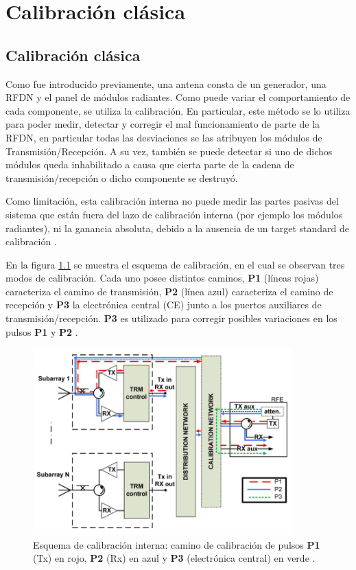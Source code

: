 
\chapter{Calibración clásica}
\label{ch:classicalCalibration}

\section{Calibración clásica}

Como fue introducido previamente, una antena consta de un generador, una RFDN y el panel de módulos radiantes. Como puede
variar el comportamiento de cada componente, se utiliza la calibración. En particular, este método se lo utiliza para poder 
medir, detectar y corregir el mal funcionamiento de parte de la RFDN, en particular todas las desviaciones se las atribuyen 
los módulos de Transmisión/Recepción. A su vez, también se puede detectar si uno de dichos módulos queda inhabilitado a 
causa que cierta parte de la cadena de transmisión/recepción o dicho componente se destruyó.

Como limitación, esta calibración interna no puede medir las partes pasivas del sistema que están fuera del lazo de 
calibración interna (por ejemplo los módulos radiantes), ni la ganancia absoluta, debido a la ausencia de un target standard
de calibración \cite{Wang2010}. 

En la figura \ref{fig:classic_cal_scheme} se muestra el esquema de calibración, en el cual se observan tres modos de 
calibración. Cada uno posee distintos caminos, \textbf{P1} (líneas rojas) caracteriza el camino de transmisión, \textbf{P2}
(línea azul) caracteriza el camino de recepción y \textbf{P3} la electrónica central (CE) junto a los puertos auxiliares de 
transmisión/recepción. \textbf{P3} es utilizado para corregir posibles variaciones en los pulsos \textbf{P1} y \textbf{P2} 
\cite{Makhoul2012}.

\begin{figure}[H]
 \centering
 \includegraphics[width=10cm]{gfx/classic_cal_scheme.png}
 \caption{Esquema de calibración interna: camino de calibración de pulsos \textbf{P1} (Tx) en rojo, \textbf{P2} (Rx) en azul 
 y \textbf{P3} (electrónica central) en verde \cite{Makhoul2012}.}
 \label{fig:classic_cal_scheme}
\end{figure}

